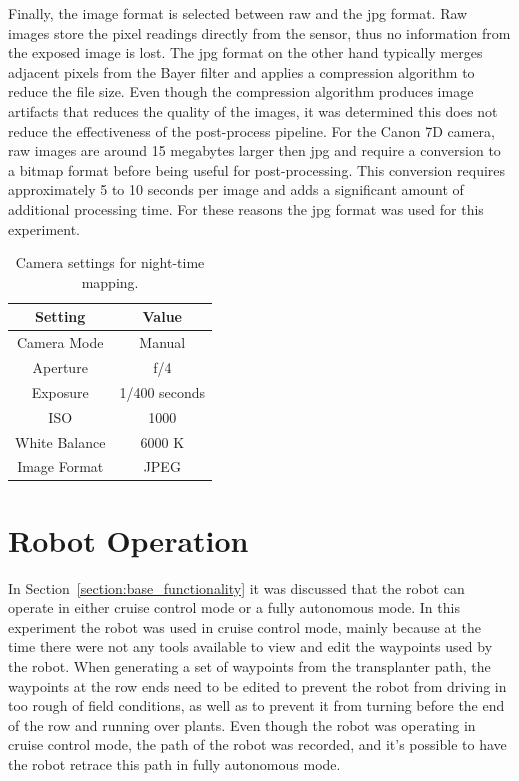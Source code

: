 Finally, the image format is selected between raw and the \ac{jpg} format.  Raw images store the pixel readings directly from the sensor, thus no information from the exposed image is lost.  The \ac{jpg} format on the other hand typically merges adjacent pixels from the Bayer filter and applies a compression algorithm to reduce the file size.  Even though the compression algorithm produces image artifacts that reduces the quality of the images, it was determined this does not reduce the effectiveness of the post-process pipeline.  For the Canon 7D camera, raw images are around 15 megabytes larger then \ac{jpg} and require a conversion to a bitmap format before being useful for post-processing.  This conversion requires approximately 5 to 10 seconds per image and adds a significant amount of additional processing time.  For these reasons the \ac{jpg} format was used for this experiment.

\begin{table}
    \begin{center}
    \caption[Camera settings]{Camera settings for night-time mapping.}
    \begin{tabular}[c]{|c|c|}
        \hline
        Setting & Value \\
        \hline
        Camera Mode     & Manual        \\
        Aperture & f/4          \\
        Exposure & 1/400 seconds   \\
        ISO      & 1000  \\
        White Balance & 6000 K \\
        Image Format & JPEG \\
        \hline
    \end{tabular}
    \label{table:camera_settings}
   \end{center}
\end{table}


\section{Robot Operation}

In Section~\ref{section:base_functionality} it was discussed that the robot can operate in either cruise control mode or a fully autonomous mode.  In this experiment the robot was used in cruise control mode, mainly because at the time there were not any tools available to view and edit the waypoints used by the robot.  When generating a set of waypoints from the transplanter path, the waypoints at the row ends need to be edited to prevent the robot from driving in too rough of field conditions, as well as to prevent it from turning before the end of the row and running over plants.  Even though the robot was operating in cruise control mode, the path of the robot was recorded, and it's possible to have the robot retrace this path in fully autonomous mode.
